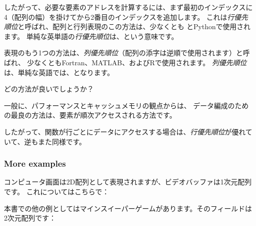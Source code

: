 
したがって、必要な要素のアドレスを計算するには、まず最初のインデックスに
4（配列の幅）を掛けてから2番目のインデックスを追加します。
これは\emph{行優先順位}と呼ばれ、配列と行列表現のこの方法は、少なくとも \CCpp とPythonで使用されます。
単純な英単語の\emph{行優先順位}は、という意味です。

表現のもう1つの方法は、\emph{列優先順位}（配列の添字は逆順で使用されます）と呼ばれ、
少なくともFortran、MATLAB、およびRで使用されます。
\emph{列優先順位}は、単純な英語では、となります。

どの方法が良いでしょうか？

一般に、パフォーマンスとキャッシュメモリの観点からは、
データ編成のための最良の方法は、要素が順次アクセスされる方法です。

したがって、関数が行ごとにデータにアクセスする場合は、\emph{行優先順位}が優れていて、逆もまた同様です。




%

\subsubsection{More examples}

コンピュータ画面は2D配列として表現されますが、ビデオバッファは1次元配列です。
これについてはこちらで：

本書での他の例としてはマインスイーパーゲームがあります。そのフィールドは2次元配列です：
